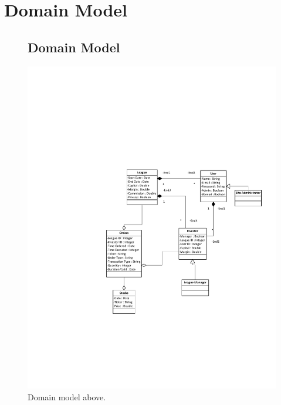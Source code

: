 \chapter{Domain Model}

\begin{figure}
\section{Domain Model}
\centering
\includegraphics[width=6.5in]{./img/domainModel.pdf}
\caption{Domain model above.}
\end{figure}

